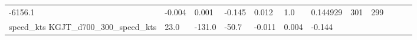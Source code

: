 \documentclass[11pt]{article}
\begin{document}
\begin{longtable}[]{@{}llllllllllll@{}}
\begin{minipage}[t]{0.04\columnwidth}
-6156.1\strut
\end{minipage} & \begin{minipage}[t]{0.04\columnwidth}\raggedright\strut
-0.004\strut
\end{minipage} & \begin{minipage}[t]{0.05\columnwidth}\raggedright\strut
0.001\strut
\end{minipage} & \begin{minipage}[t]{0.04\columnwidth}\raggedright\strut
-0.145\strut
\end{minipage} & \begin{minipage}[t]{0.04\columnwidth}\raggedright\strut
0.012\strut
\end{minipage} & \begin{minipage}[t]{0.05\columnwidth}\raggedright\strut
1.0\strut
\end{minipage} & \begin{minipage}[t]{0.05\columnwidth}\raggedright\strut
0.144929\strut
\end{minipage} & \begin{minipage}[t]{0.05\columnwidth}\raggedright\strut
301\strut
\end{minipage} & \begin{minipage}[t]{0.07\columnwidth}\raggedright\strut
299\strut
\end{minipage}\tabularnewline
\begin{minipage}[t]{0.18\columnwidth}\raggedright\strut
speed\_kts KGJT\_d700\_300\_speed\_kts\strut
\end{minipage} & \begin{minipage}[t]{0.04\columnwidth}\raggedright\strut
23.0\strut
\end{minipage} & \begin{minipage}[t]{0.04\columnwidth}\raggedright\strut
-131.0\strut
\end{minipage} & \begin{minipage}[t]{0.04\columnwidth}\raggedright\strut
-50.7\strut
\end{minipage} & \begin{minipage}[t]{0.04\columnwidth}\raggedright\strut
-0.011\strut
\end{minipage} & \begin{minipage}[t]{0.05\columnwidth}\raggedright\strut
0.004\strut
\end{minipage} & \begin{minipage}[t]{0.04\columnwidth}\raggedright\strut
-0.144\strut
\end{minipage} & \begin{minipage}[t]{0.04\columnwidth}\raggedright\strut

\end{minipage}
\end{longtable}
\end{document}
